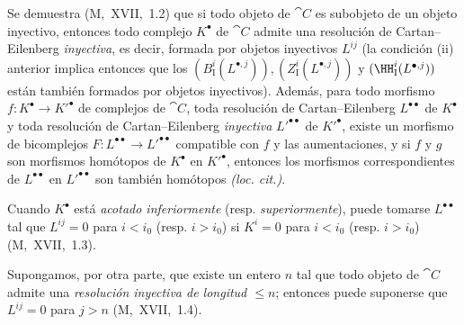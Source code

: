 \documentclass[oneside]{amsart}
\renewcommand{\leq}{\leqslant}
\begin{document}
\begin{env}[11.4.2]
Se demuestra (M,~XVII,~1.2) que si todo objeto de $\cat{C}$ es subobjeto de un objeto inyectivo, entonces todo complejo $K^\bullet$ de $\cat{C}$ admite una resolución de Cartan--Eilenberg \emph{inyectiva}, es decir, formada por objetos inyectivos $L^{ij}$ (la condición (ii) anterior implica entonces que los $(B_\mathrm{I}^i(L^{\bullet,j})), (Z_\mathrm{I}^i(L^{\bullet,j}))$ y $(\HH_\mathrm{I}^i(L^{\bullet,j}))$ están también formados por objetos inyectivos).
Además, para todo morfismo $f: K^\bullet \rightarrow K'^\bullet$ de complejos de $\cat{C}$,
toda resolución de Cartan--Eilenberg $L^{\bullet\bullet}$ de $K^\bullet$ y toda resolución de Cartan--Eilenberg \emph{inyectiva} $L'^{\bullet\bullet}$ de $K'^\bullet$, existe un morfismo de bicomplejos $F: L^{\bullet\bullet} \rightarrow L'^{\bullet\bullet}$ compatible con $f$ y las aumentaciones, y si $f$ y $g$ son morfismos homótopos de $K^\bullet$ en $K'^\bullet$, entonces los morfismos correspondientes de $L^{\bullet\bullet}$ en $L'^{\bullet\bullet}$ son también homótopos \emph{(loc. cit.)}.

Cuando $K^{\bullet}$ está \emph{acotado inferiormente} (resp. \emph{superiormente}), puede tomarse $L^{\bullet\bullet}$ tal que $L^{ij}=0$ para $i<i_0$ (resp. $i>i_0$) si $K^i=0$ para $i<i_0$ (resp. $i>i_0$) (M,~XVII,~1.3).

Supongamos, por otra parte, que existe un entero $n$ tal que todo objeto de $\cat{C}$ admite una \emph{resolución inyectiva de longitud $\leq n$};
entonces puede suponerse que $L^{ij}=0$ para $j>n$ (M,~XVII,~1.4).
\end{env}
\end{document}
